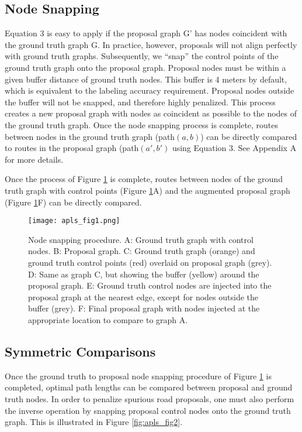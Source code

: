\documentclass{article}
\begin{document}
\subsection{Node Snapping}

Equation 3 is easy to apply if the proposal graph G' has nodes coincident with the ground truth graph G. In practice, however, proposals will not align perfectly with ground truth graphs. Subsequently, we ``snap'' the control points of the ground truth graph onto the proposal graph. Proposal nodes must be within a given buffer distance of ground truth nodes.  This buffer is 4 meters by default, which is equivalent to the labeling accuracy requirement.  Proposal nodes outside the buffer will not be snapped, and therefore highly penalized.  This process creates a new proposal graph with nodes as coincident as possible to the nodes of the ground truth graph.  Once the node snapping process is complete, routes between nodes in the ground truth graph (path$(a,b)$) can be directly compared to routes in the proposal graph (path$(a',b')$ using Equation 3.  
See Appendix A for more details.

Once the process of Figure \ref{fig:apls_fig1} is complete, routes between nodes of  the ground truth graph with control points (Figure \ref{fig:apls_fig1}A) and the augmented proposal graph (Figure \ref{fig:apls_fig1}F) can be directly compared.

\begin{figure}[h]
  \centering
     \texttt{[image: apls\_fig1.png]}
  \caption{Node snapping procedure. A: Ground truth graph with control nodes. B: Proposal graph. C: Ground truth graph (orange) and ground truth control points (red) overlaid on proposal graph (grey). D: Same as graph C, but showing the buffer (yellow) around the proposal graph. E: Ground truth control nodes are injected into the proposal graph at the nearest edge, except for nodes outside the buffer (grey). F: Final proposal graph with nodes injected at the appropriate location to compare to graph A.}
  \label{fig:apls_fig1}
\end{figure}

\subsection{Symmetric Comparisons}

Once the ground truth to proposal node snapping procedure of Figure \ref{fig:apls_fig1} is completed, optimal path lengths can be compared between proposal and ground truth nodes. In order to penalize spurious road proposals, one must also perform the inverse operation by snapping proposal control nodes onto the ground truth graph. This is illustrated in Figure \ref{fig:apls_fig2}.
\end{document}
